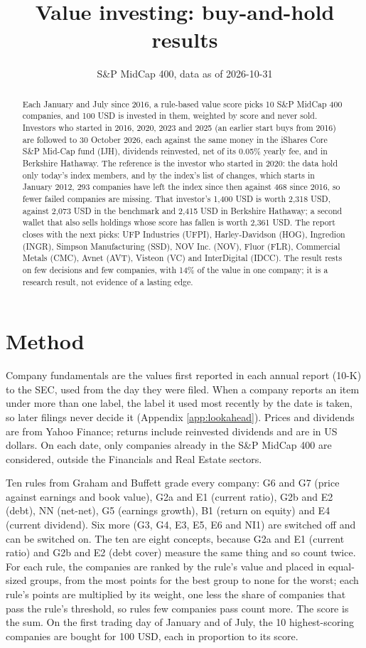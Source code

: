 \documentclass[11pt,a4paper]{article}
\title{Value investing: buy-and-hold results}
\author{S\&P MidCap 400, data as of 2026-10-31}
\date{}
\begin{document}
\maketitle
\begin{abstract}
Each January and July since 2016, a rule-based value score picks 10 S\&P MidCap 400 companies, and 100 USD is invested in them, weighted by score and never sold. Investors who started in 2016, 2020, 2023 and 2025 (an earlier start buys from 2016) are followed to 30 October 2026, each against the same money in the iShares Core S\&P Mid-Cap fund (IJH), dividends reinvested, net of its 0.05\% yearly fee, and in Berkshire Hathaway. The reference is the investor who started in 2020: the data hold only today's index members, and by the index's list of changes, which starts in January 2012, 293 companies have left the index since then against 468 since 2016, so fewer failed companies are missing. That investor's 1,400 USD is worth 2,318 USD, against 2,073 USD in the benchmark and 2,415 USD in Berkshire Hathaway; a second wallet that also sells holdings whose score has fallen is worth 2,361 USD. The report closes with the next picks: UFP Industries (UFPI), Harley-Davidson (HOG), Ingredion (INGR), Simpson Manufacturing (SSD), NOV Inc. (NOV), Fluor (FLR), Commercial Metals (CMC), Avnet (AVT), Visteon (VC) and InterDigital (IDCC). The result rests on few decisions and few companies, with 14\% of the value in one company; it is a research result, not evidence of a lasting edge.
\end{abstract}
\section{Method}
Company fundamentals are the values first reported in each annual report (10-K) to the SEC, used from the day they were filed. When a company reports an item under more than one label, the label it used most recently by the date is taken, so later filings never decide it (Appendix \ref{app:lookahead}). Prices and dividends are from Yahoo Finance; returns include reinvested dividends and are in US dollars. On each date, only companies already in the S\&P MidCap 400 are considered, outside the Financials and Real Estate sectors.

Ten rules from Graham and Buffett grade every company: G6 and G7 (price against earnings and book value), G2a and E1 (current ratio), G2b and E2 (debt), NN (net-net), G5 (earnings growth), B1 (return on equity) and E4 (current dividend). Six more (G3, G4, E3, E5, E6 and NI1) are switched off and can be switched on. The ten are eight concepts, because G2a and E1 (current ratio) and G2b and E2 (debt cover) measure the same thing and so count twice. For each rule, the companies are ranked by the rule's value and placed in equal-sized groups, from the most points for the best group to none for the worst; each rule's points are multiplied by its weight, one less the share of companies that pass the rule's threshold, so rules few companies pass count more. The score is the sum. On the first trading day of January and of July, the 10 highest-scoring companies are bought for 100 USD, each in proportion to its score.
\end{document}
